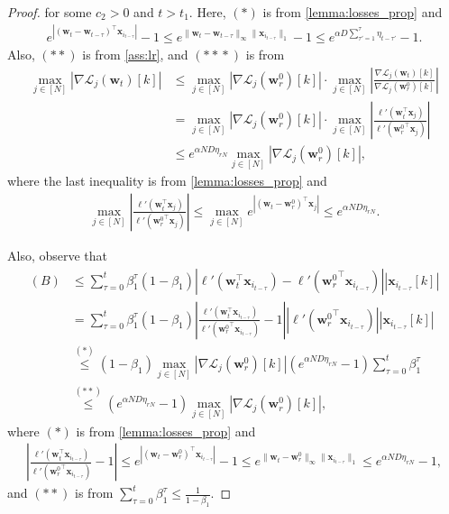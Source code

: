 \documentclass{article} %
\theoremstyle{plain}
\theoremstyle{definition}
\theoremstyle{remark}
\def\bigabs#1{\left|#1\right|}
\newcommand{\Ls}{\mathcal{L}}
\def\bx{{\mathbf x}}
\def\bw{{\mathbf w}}
\begin{document}
\begin{proof}
    for some $c_2>0$ and $t > t_1$. Here, $(*)$ is from \cref{lemma:losses_prop} and
    \begin{align*}
       e^{|(\bw_t-\bw_{t-\tau})^\top \bx_{i_{t-\tau}}|}-1 \leq e^{\|\bw_t-\bw_{t-\tau}\|_\infty \|\bx_{i_{t-\tau}}\|_1}-1 \leq e^{\alpha D\sum_{\tau'=1}^\tau \eta_{t-\tau'}}-1.
    \end{align*}
    Also, $(**)$ is from \cref{ass:lr}, and $({**}{*})$ is from
    \begin{align*}
    \max_{j \in [N]} |\nabla \Ls_j(\bw_t)[k]|
    &\leq \max_{j \in [N]} |\nabla \mathcal{L}_j(\bw_r^0)[k]| \cdot \max_{j \in [N]} \left| \frac{\nabla \mathcal{L}_j(\bw_t)[k]}{\nabla \mathcal{L}_j(\bw_r^0)[k]} \right| \\
    &= \max_{j \in [N]} |\nabla \mathcal{L}_j(\bw_r^0)[k]| \cdot \max_{j \in [N]} \left| \frac{\ell'(\bw_t^\top \bx_j)}{\ell'({\bw_r^{0}}^\top \bx_j)} \right| \\
    &\leq e^{\alpha N D \eta_{rN}} \max_{j \in [N]} |\nabla \mathcal{L}_j(\bw_r^0)[k]|,
\end{align*}
where the last inequality is from \cref{lemma:losses_prop} and  
\begin{align*}
    \max_{j \in [N]} \left| \frac{\ell'(\bw_t^\top \bx_j)}{\ell'({\bw_r^{0}}^\top \bx_j)} \right| \leq\max_{j \in [N]} e^{\bigabs{(\bw_t-\bw_r^0)^\top \bx_j}} \leq e^{\alpha ND\eta_{rN}}.
\end{align*}

    Also, observe that
    \begin{align*}
        (B)&\leq \sum_{\tau=0}^t \beta_1^\tau(1-\beta_1)|\ell'(\bw_t^\top \bx_{i_{t-\tau}}) - \ell'({\bw_r^0}^\top \bx_{i_{t-\tau}})||\bx_{i_{t-\tau}}[k]| \\
        &= \sum_{\tau=0}^t \beta_1^\tau(1-\beta_1)\left|\frac{\ell'(\bw_t^\top \bx_{i_{t-\tau}})}{\ell'({\bw_r^0}^\top \bx_{i_{t-\tau}})} - 1\right||\ell'({\bw_r^0}^\top \bx_{i_{t-\tau}})||\bx_{i_{t-\tau}}[k]| \\
        & \overset{(*)}{\leq} (1-\beta_1)\max_{j \in [N]}|\nabla \Ls_j(\bw_r^0)[k]| (e^{\alpha ND \eta_{rN}}-1)\sum_{\tau=0}^t \beta_1^\tau \\
        & \overset{(**)}{\leq} (e^{\alpha ND \eta_{rN}}-1)\max_{j \in [N]}|\nabla \Ls_j(\bw_r^0)[k]|,
    \end{align*}
    where $(*)$ is from \cref{lemma:losses_prop} and 
    \begin{align*}
        \left|\frac{\ell'(\bw_t^\top \bx_{i_{t-\tau}})}{\ell'({\bw_r^0}^\top \bx_{i_{t-\tau}})} - 1\right| \leq 
        e^{|(\bw_t-\bw_r^0)^\top \bx_{i_{t-\tau}}|}-1 \leq e^{\|\bw_t-\bw_r^0\|_\infty \|\bx_{i_{t-\tau}}\|_1} \leq e^{\alpha ND \eta_{rN}}-1,
    \end{align*}
    and $(**)$ is from $\sum_{\tau=0}^t \beta_1^\tau \leq \frac{1}{1-\beta_1}$.


\end{proof}
\end{document}
